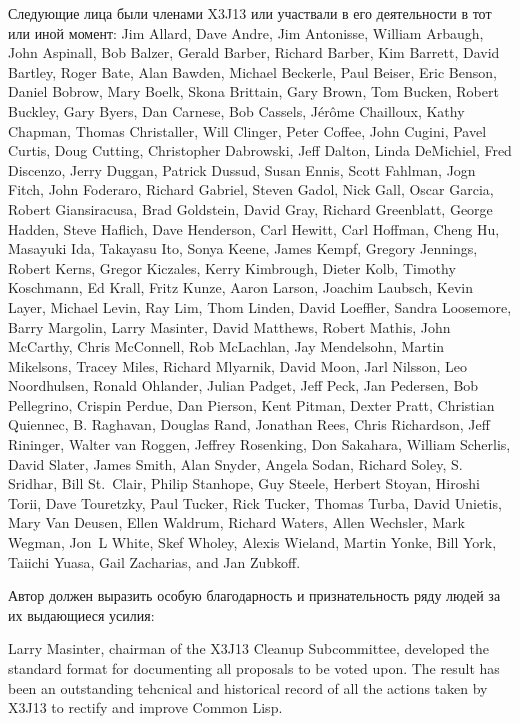 Следующие лица были членами X3J13 или участвали в его
деятельности в тот или иной момент:
Jim Allard, Dave Andre, Jim Antonisse, William Arbaugh, John
Aspinall, Bob Balzer, Gerald Barber, Richard Barber, Kim Barrett,
David Bartley, Roger Bate, Alan Bawden, Michael Beckerle, Paul
Beiser, Eric Benson, Daniel Bobrow, Mary Boelk, Skona Brittain, Gary
Brown, Tom Bucken, Robert Buckley, Gary Byers, Dan Carnese, Bob
Cassels, J\'er\^ome Chailloux, Kathy Chapman, Thomas Christaller,
Will Clinger, Peter Coffee, John Cugini, Pavel Curtis, Doug Cutting,
Christopher Dabrowski, Jeff Dalton, Linda DeMichiel, Fred Discenzo,
Jerry Duggan, Patrick Dussud, Susan Ennis, Scott Fahlman, Jogn Fitch,
John Foderaro, Richard Gabriel, Steven Gadol, Nick Gall, Oscar
Garcia, Robert Gian\-sira\-cusa, Brad Goldstein, David Gray, Richard
Greenblatt, George Hadden, Steve Haflich, Dave Henderson, Carl
Hewitt, Carl Hoffman, Cheng Hu, Masayuki Ida, Takayasu Ito, Sonya
Keene, James Kempf, Gregory Jennings, Robert Kerns, Gregor Kiczales,
Kerry Kimbrough, Dieter Kolb, Timothy Koschmann, Ed Krall, Fritz
Kunze, Aaron Larson, Joachim Laubsch, Kevin Layer, Michael Levin, Ray
Lim, Thom Linden, David Loeffler, Sandra Loosemore, Barry Margolin,
Larry Masinter, David Matthews, Robert Mathis, John McCarthy, Chris
McConnell, Rob McLachlan, Jay Mendelsohn, Martin Mikelsons, Tracey
Miles, Richard Mlyarnik, David Moon, Jarl Nilsson, Leo Noordhulsen,
Ronald Ohlander, Julian Padget, Jeff Peck, Jan Pedersen, Bob
Pellegrino, Crispin Perdue, Dan Pierson, Kent Pitman, Dexter Pratt,
Christian Quiennec, B. Raghavan, Douglas Rand, Jonathan Rees, Chris
Richardson, Jeff Rininger, Walter van Roggen, Jeffrey Rosenking,  Don
Sakahara, William Scherlis, David Slater, James Smith, Alan Snyder,
Angela Sodan, Richard Soley, S. Sridhar, Bill St.\ Clair, Philip
Stanhope, Guy Steele, Herbert Stoyan, Hiroshi Torii, Dave Touretzky,
Paul Tucker, Rick Tucker, Thomas Turba, David Unietis, Mary Van
Deusen, Ellen Waldrum, Richard Waters, Allen Wechsler, Mark Wegman,
Jon~L White, Skef Wholey, Alexis Wieland, Martin Yonke, Bill York,
Taiichi Yuasa, Gail Zacharias, and Jan Zubkoff.

Автор должен выразить особую благодарность и признательность ряду
людей за их выдающиеся усилия:

Larry Masinter, chairman of
the X3J13 Cleanup Subcommittee, developed the standard format for
documenting all proposals to be voted upon.  The result has been
an outstanding tehcnical and historical record of all the actions
taken by X3J13 to rectify and improve Common Lisp.

